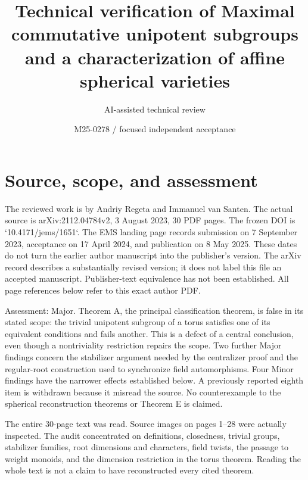 \documentclass[10pt]{article}
\title{Technical verification of
Maximal commutative unipotent subgroups and a characterization of affine spherical varieties}
\author{AI-assisted technical review}
\date{M25-0278 / focused independent acceptance}
\begin{document}
\maketitle
\section*{Source, scope, and assessment}
The reviewed work is by Andriy Regeta and Immanuel van Santen. The actual source is arXiv:2112.04784v2, 3 August 2023, 30 PDF pages. The frozen DOI is `10.4171/jems/1651`. The EMS landing page records submission on 7 September 2023, acceptance on 17 April 2024, and publication on 8 May 2025. These dates do not turn the earlier author manuscript into the publisher’s version. The arXiv record describes a substantially revised version; it does not label this file an accepted manuscript. Publisher-text equivalence has not been established. All page references below refer to this exact author PDF.\par
Assessment: Major. Theorem A, the principal classification theorem, is false in its stated scope: the trivial unipotent subgroup of a torus satisfies one of its equivalent conditions and fails another. This is a defect of a central conclusion, even though a nontriviality restriction repairs the scope. Two further Major findings concern the stabilizer argument needed by the centralizer proof and the regular-root construction used to synchronize field automorphisms. Four Minor findings have the narrower effects established below. A previously reported eighth item is withdrawn because it misread the source. No counterexample to the spherical reconstruction theorems or Theorem E is claimed.\par
The entire 30-page text was read. Source images on pages 1–28 were actually inspected. The audit concentrated on definitions, closedness, trivial groups, stabilizer families, root dimensions and characters, field twists, the passage to weight monoids, and the dimension restriction in the torus theorem. Reading the whole text is not a claim to have reconstructed every cited theorem.\par
\end{document}
